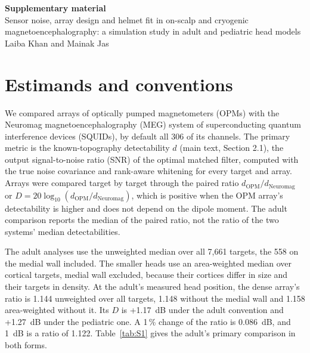 \documentclass[preprint,12pt,authoryear,a4paper]{elsarticle}
\begin{document}
\begin{center}
{\Large\bfseries Supplementary material}\\[2mm]
{\large Sensor noise, array design and helmet fit in on-scalp and cryogenic magnetoencephalography: a simulation study in adult and pediatric head models}\\[2mm]
Laiba Khan and Mainak Jas
\end{center}
\linenumbers
\section{Estimands and conventions}\label{sec:S1}

We compared arrays of optically pumped magnetometers (OPMs) with the Neuromag magnetoencephalography (MEG) system of superconducting quantum interference devices (SQUIDs), by default all 306 of its channels. The primary metric is the known-topography detectability $d$ (main text, Section 2.1), the output signal-to-noise ratio (SNR) of the optimal matched filter, computed with the true noise covariance and rank-aware whitening for every target and array. Arrays were compared target by target through the paired ratio $d_{\mathrm{OPM}}/d_{\mathrm{Neuromag}}$ or $D = 20\log_{10}(d_{\mathrm{OPM}}/d_{\mathrm{Neuromag}})$, which is positive when the OPM array's detectability is higher and does not depend on the dipole moment. The adult comparison reports the median of the paired ratio, not the ratio of the two systems' median detectabilities.

The adult analyses use the unweighted median over all 7,661 targets, the 558 on the medial wall included. The smaller heads use an area-weighted median over cortical targets, medial wall excluded, because their cortices differ in size and their targets in density. At the adult's measured head position, the dense array's ratio is 1.144 unweighted over all targets, 1.148 without the medial wall and 1.158 area-weighted without it. Its $D$ is +1.17~dB under the adult convention and +1.27~dB under the pediatric one. A 1\,\% change of the ratio is 0.086~dB, and 1~dB is a ratio of 1.122. Table~\ref{tab:S1} gives the adult's primary comparison in both forms.
\end{document}
